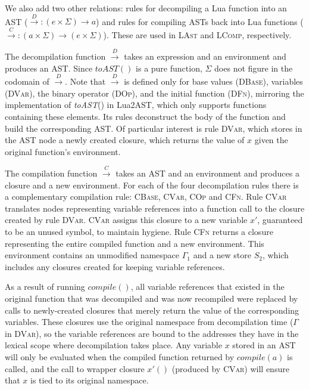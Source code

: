 \documentclass[english]{llncs}
\begin{document}
We also add two other relations: rules for decompiling a Lua function
into an AST ($\overset{D}{\rightarrow}:(e\times\Sigma)\rightarrow a$)
and rules for compiling ASTs back into Lua functions ($\overset{C}{\rightarrow}:(a\times\Sigma)\rightarrow(e\times\Sigma)$).
These are used in \textsc{LAst} and \textsc{LComp}, respectively.

The decompilation function $\overset{D}{\rightarrow}$ takes an expression
and an environment and produces an AST. Since $toAST()$ is a pure
function, $\Sigma$ does not figure in the codomain of $\overset{D}{\rightarrow}$.
Note that $\overset{D}{\rightarrow}$ is defined only for base values
(\textsc{DBase}), variables (\textsc{DVar}), the binary operator (\textsc{DOp}),
and the initial function (\textsc{DFn}), mirroring the implementation
of \emph{toAST}() in Lua2AST, which only supports functions containing
these elements. Its rules deconstruct the body of the function and
build the corresponding AST. Of particular interest is rule \textsc{DVar},
which stores in the AST node a newly created closure, which returns
the value of $x$ given the original function's environment.

The compilation function $\overset{C}{\rightarrow}$ takes an AST
and an environment and produces a closure and a new environment. For
each of the four decompilation rules there is a complementary compilation
rule: \textsc{CBase}, \textsc{CVar}, \textsc{COp} and \textsc{CFn}.
Rule \textsc{CVar} translates nodes representing variable references
into a function call to the closure created by rule \textsc{DVar}.
\textsc{CVar} assigns this closure to a new variable $x'$, guaranteed
to be an unused symbol, to maintain hygiene. Rule \textsc{CFn} returns
a closure representing the entire compiled function and a new environment.
This environment contains an unmodified namespace $\Gamma_{1}$ and
a new store $S_{2}$, which includes any closures created for keeping
variable references.

As a result of running $compile()$, all variable references that
existed in the original function that was decompiled and was now recompiled
were replaced by calls to newly-created closures that merely return
the value of the corresponding variables. These closures use the original
namespace from decompilation time ($\Gamma$ in \textsc{DVar}), so
the variable references are bound to the addresses they have in the
lexical scope where decompilation takes place. Any variable $x$ stored
in an AST will only be evaluated when the compiled function returned
by $compile(a)$ is called, and the call to wrapper closure $x'()$
(produced by \textsc{CVar}) will ensure that $x$ is tied to its original
namespace.
\end{document}
